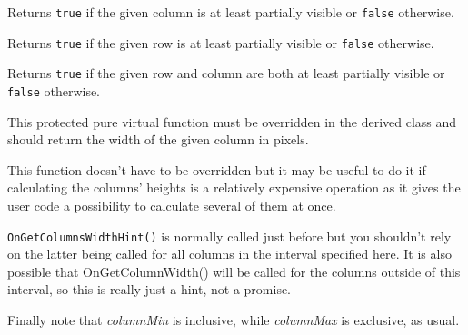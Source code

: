 
Returns {\tt true} if the given column is at least partially visible or
{\tt false} otherwise.


\label{wxhvscrolledwindowisrowvisible}


Returns {\tt true} if the given row is at least partially visible or {\tt false}
otherwise.


\label{wxhvscrolledwindowisvisible}


Returns {\tt true} if the given row and column are both at least partially
visible or {\tt false} otherwise.


\label{wxhvscrolledwindowongetcolumnwidth}


This protected pure virtual function must be overridden in the derived class
and should return the width of the given column in pixels.




\label{wxhvscrolledwindowongetcolumnswidthhint}


This function doesn't have to be overridden but it may be useful to do
it if calculating the columns' heights is a relatively expensive operation
as it gives the user code a possibility to calculate several of them at
once.

{\tt OnGetColumnsWidthHint()} is normally called just before 
 but you
shouldn't rely on the latter being called for all columns in the interval
specified here. It is also possible that OnGetColumnWidth() will be
called for the columns outside of this interval, so this is really just a
hint, not a promise.

Finally note that {\it columnMin} is inclusive, while {\it columnMax} is exclusive,
as usual.


